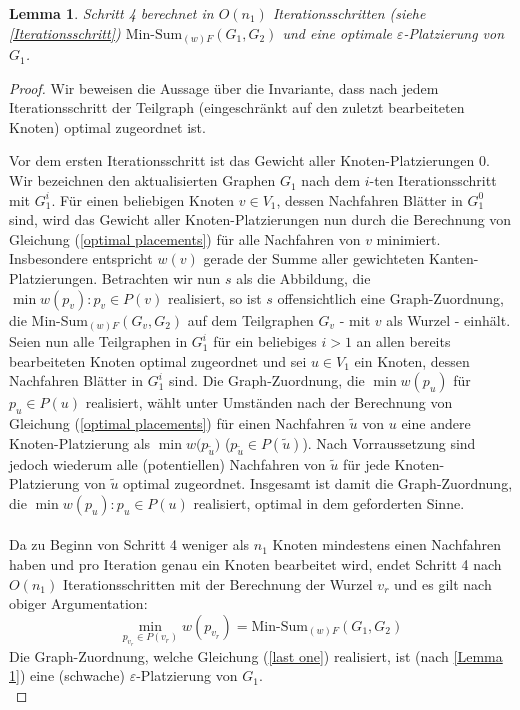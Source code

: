 \documentclass[a4paper, 12pt, twoside]{article}
\theoremstyle{Format1} %
\newtheorem{Lem}[Def]{Lemma}                %
\begin{document}
\begin{Lem} \label{Lemma 2}
	Schritt 4 berechnet in $O(n_1)$ Iterationsschritten (siehe \ref{Iterationsschritt}) $\text{Min-Sum}_{(w)F}(G_1,G_2)$ und
	eine optimale $\varepsilon$-Platzierung von $G_1$.
\end{Lem}

\begin{proof}
Wir beweisen die Aussage über die Invariante, dass nach jedem Iterationsschritt der Teilgraph (eingeschränkt auf
den zuletzt bearbeiteten Knoten) optimal zugeordnet ist.

Vor dem ersten Iterationsschritt ist das Gewicht aller Knoten-Platzierungen $0$.
Wir bezeichnen den aktualisierten Graphen $G_1$ nach dem $i$-ten Iterationsschritt mit $G_1^i$.
Für einen beliebigen Knoten $v \in V_1$, dessen Nachfahren Blätter in $G_1^0$ sind, wird das Gewicht aller Knoten-Platzierungen nun durch die Berechnung von Gleichung (\ref{optimal placements})
für alle Nachfahren von $v$ minimiert. Insbesondere entspricht $w(v)$ gerade der Summe aller gewichteten Kanten-Platzierungen. Betrachten wir nun $s$ als die Abbildung, die $\min{w(p_v)}: p_v \in P(v)$ realisiert,
so ist $s$ offensichtlich eine Graph-Zuordnung, die Min-Sum$_{(w)F}(G_v, G_2)$ auf dem Teilgraphen $G_v$ - mit $v$ als Wurzel - einhält.
\\
Seien nun alle Teilgraphen in $G_1^i$ für ein beliebiges $i>1$ an allen bereits bearbeiteten Knoten optimal zugeordnet und sei $u \in V_1$ ein Knoten, dessen
Nachfahren Blätter in $G_1^i$ sind. Die Graph-Zuordnung, die $\min{w(p_u)}$ für $p_u \in P(u)$ realisiert, wählt unter Umständen nach der Berechnung von Gleichung (\ref{optimal placements})
	für einen Nachfahren $\tilde{u}$ von $u$ eine andere Knoten-Platzierung als $\min{w(p_{\tilde{u}}})$ ($p_{\tilde{u}} \in P(\tilde{u})$). Nach Vorraussetzung sind jedoch
wiederum alle (potentiellen) Nachfahren von $\tilde{u}$ für jede Knoten-Platzierung von $\tilde{u}$ optimal zugeordnet. Insgesamt ist damit die Graph-Zuordnung, die $\min{w(p_u)}: p_u \in P(u)$ realisiert,
optimal in dem geforderten Sinne.
\\
\\
Da zu Beginn von Schritt 4 weniger als $n_1$ Knoten mindestens einen Nachfahren haben und pro Iteration genau ein Knoten bearbeitet wird,
endet Schritt 4 nach $O(n_1)$ Iterationsschritten mit der Berechnung der Wurzel $v_r$ und es gilt nach obiger Argumentation:
\begin{equation}
	\min_{p_{v_r} \in P(v_r)}{w(p_{v_r})} = \text{Min-Sum}_{(w)F}(G_1,G_2) \label {last one}
\end{equation}
Die Graph-Zuordnung, welche Gleichung (\ref{last one}) realisiert, ist (nach \ref{Lemma 1}) eine (schwache) $\varepsilon$-Platzierung von $G_1$.
\\
\end{proof}
\end{document}
